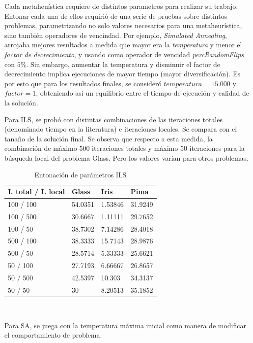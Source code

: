\documentclass[11pt]{article}
\begin{document}
Cada metaheuística requiere de distintos parametros para realizar
su trabajo. Entonar cada una de ellos requirió de una serie 
de pruebas sobre distintos problemas, parametrizando
no solo valores necesarios para una metaheurística, sino también operadores de vencindad. 
Por ejemplo, \emph{Simulated Annealing}, arrojaba mejores 
resultados a medida que mayor era la \emph{temperatura} y menor el \emph{factor de decrecimiento},
y usando como operador de vencidad \emph{percRandomFlips} con $5\%$. Sin embargo,
aumentar la temperatura y disminuir el factor de decrecimiento implica ejecuciones 
de mayor tiempo (mayor
diversificación). Es por esto que para los resultados finales, se consideró $temperatura = 15.000$ 
y $factor = 1$, obteniendo así un equilibrio entre el tiempo de ejecución y calidad de la solución. 


Para ILS, se probó con distintas combinaciones de las iteraciones totales (denominado tiempo en la literatura) e iteraciones locales. Se compara con el tanaño de la solución final. Se observa que respecto a esta medida, la combinación de máximo 500 iteraciones totales y máximo 50 iteraciones para la búsqueda local del problema Glass. Pero los valores varían para otros problemas.

\begin{table}[h]
\begin{tabular}{ |l|l|l|l| }
    \hline
    I. total / I. local & Glass & Iris & Pima \\ \hline
    100 / 100 & 54.0351 & 1.53846 & 31.9249 \\ \hline
    100 / 500 & 30.6667 & 1.11111 & 29.7652 \\ \hline
    100 / 50 & 38.7302 & 7.14286 & 28.4018 \\ \hline
    500 / 100 & 38.3333 & 15.7143 & 28.9876 \\ \hline
    500 / 50 & 28.5714 & 5.33333 & 25.6621 \\ \hline
    50 / 100 & 27.7193 & 6.66667 & 26.8657 \\ \hline
    50 / 500 & 42.5397 & 10.303 & 34.3137 \\ \hline
    50 / 50 & 30 & 8.20513 & 35.1852 \\ \hline
\end{tabular}
\caption{Entonación de parámetros ILS}
\label{tabla:1}
\end{table}

~\

Para SA, se juega con la temperatura máxima inicial como manera de modificar el comportamiento de problema.
\end{document}
